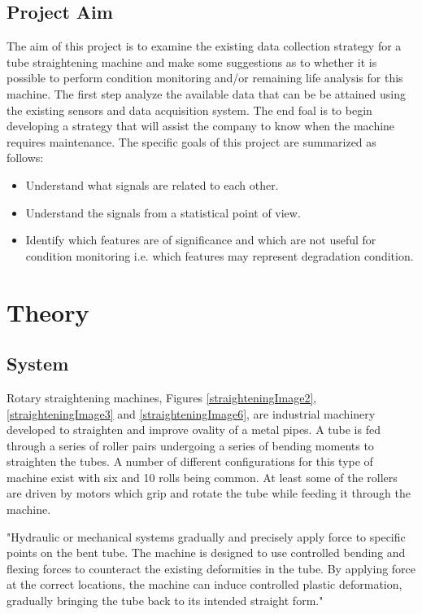 \documentclass[]{article}
\begin{document}
\subsection{Project Aim}
The aim of this project is to examine the existing data collection strategy for a tube straightening machine and make some suggestions as to whether it is possible to perform condition monitoring and/or remaining life analysis for this machine. The first step analyze the available data that can be be attained using the existing sensors and data acquisition system. The end foal is to begin developing a strategy that will assist the company to know when the machine requires maintenance. The specific goals of this project are summarized as follows:
\begin{itemize}
\item Understand what signals are related to each other.
\item Understand the signals from a statistical point of view.
\item Identify which features are of significance and which are not useful for condition monitoring i.e. which features may represent degradation condition.
\end{itemize}
\clearpage  
\section{Theory}
\subsection{System}
Rotary straightening machines, Figures \ref{straighteningImage2}, \ref{straighteningImage3} and \ref{straighteningImage6}, are industrial machinery developed to straighten and improve ovality of a metal pipes. A tube is fed through a series of roller pairs undergoing a series of bending moments to straighten the tubes. A number of different configurations for this type of machine exist with six and 10 rolls being common. At least some of the rollers are driven by motors which grip and rotate the tube while feeding it through the machine.

"Hydraulic or mechanical systems gradually and precisely apply force to specific points on the bent tube. The machine is designed to use controlled bending and flexing forces to counteract the existing deformities in the tube. By applying force at the correct locations, the machine can induce controlled plastic deformation, gradually bringing the tube back to its intended straight form."
\end{document}
